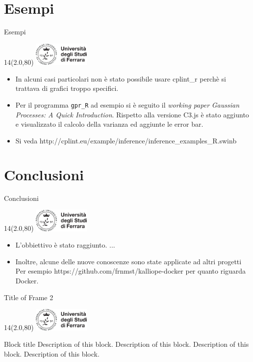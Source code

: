 \documentclass[11pt,xcolor={dvipsnames},default]{beamer} %
\newcommand{\MyLogo}{%
\begin{textblock}{14}(2.0,80)
 \includegraphics[height=1.15cm, angle=0]{logo}
\end{textblock}
}
\begin{document}
\section{Esempi}
\begin{frame}{Esempi}
\transboxin
\MyLogo
\begin{itemize}
\item In alcuni casi particolari non è stato possibile usare cplint\_r perchè 
si trattava di grafici troppo specifici.
\item Per il programma \texttt{gpr\_R} ad esempio si è seguito il \emph{working 
paper} \emph{Gaussian Processes: A Quick Introduction}. 
Rispetto alla versione C3.js è stato aggiunto e visualizzato il calcolo della 
varianza ed aggiunte le error bar.
\item Si veda http://cplint.eu/example/inference/inference\_examples\_R.swinb
\end{itemize}
\end{frame}

\section{Conclusioni}
\begin{frame}{Conclusioni}
\transboxin
\MyLogo
\begin{itemize}
\item L'obbiettivo è stato raggiunto. ...
\item Inoltre, alcune delle nuove conoscenze sono state applicate ad altri 
progetti Per esempio https://github.com/frnmst/kalliope-docker per quanto 
riguarda Docker.
\end{itemize}
\end{frame}






\iffalse
\begin{frame}{Title of Frame 2}
\MyLogo
\begin{center}
\begin{alertblock}{Block title}
Description of this block. Description of this block. Description of this block. Description of this block. \\
\end{alertblock}
\vspace{0.8cm}
\end{center}
\end{frame}
\end{document}
